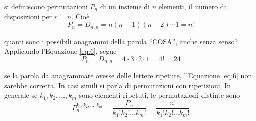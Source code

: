 \documentclass{subfiles}
\begin{document}
\begin{Definition*}
    si definiscono permutazioni \(P_{n}\) di un insieme di \(n\) elementi, il numero di disposizioni per \(r = n\). Cioè
    \begin{equation}
        P_{n} = D_{n, n} = n(n - 1)(n - 2) \cdots 1 = n!
    \end{equation}
\end{Definition*}

\begin{Example*}
    quanti sono i possibili anagrammi della parola ``COSA'', anche senza senso?
    \\
    Applicando l'Equazione \eqref{eq:6}, segue
    \[
        P_{n} = D_{n, n} = 4 \cdot 3 \cdot 2 \cdot 1  = 4! = 24
    \]
\end{Example*}
\noindent
\begin{Remark*}
    se la parola da anagrammare avesse delle lettere ripetute, l'Equazione \eqref{eq:6} non sarebbe corretta.
    In casi simili si parla di permutazioni con ripetizioni. In generale se \(k_{1}, k_{2}, \dots, k_{m}\) sono elementi ripetuti, le permutazioni distinte sono
    \[
        P_{n}^{k_{1}, k_{2}, \dots, k_{m}} = \frac{P_{n}}{k_{1}! k_{2}! \dots k_{m}!} = \frac{n!}{k_{1}! k_{2}! \dots k_{m}!}
    \]
\end{Remark*}
\end{document}
